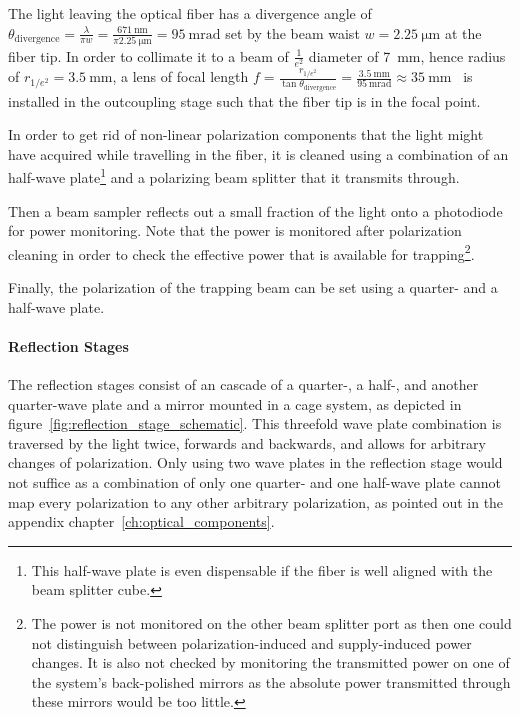The light leaving the optical fiber has a divergence angle of $\theta_\text{divergence} = \frac{\lambda}{\pi w} = \frac{\SI{671}{\nano\meter}}{\pi\SI{2.25}{\micro\meter}} = \SI{95}{\milli\radian}$ set by the beam waist $w = \SI{2.25}{\micro\meter}$ at the fiber tip. In order to collimate it to a beam of $\frac{1}{e^2}$ diameter of \SI{7}{\milli\meter}, hence radius of $r_{1/e^2} = \SI{3.5}{\milli\meter}$, a lens of focal length $f = \frac{r_{1/e^2}}{\tan \theta_\text{divergence}} = \frac{\SI{3.5}{\milli\meter}}{\SI{95}{\milli\radian}} \approx \SI{35}{\milli\meter}$~\cite{noauthor_collimated_2021} is installed in the outcoupling stage such that the fiber tip is in the focal point.

In order to get rid of non-linear polarization components that the light might have acquired while travelling in the fiber, it is cleaned using a combination of an half-wave plate\footnote{This half-wave plate is even dispensable if the fiber is well aligned with the beam splitter cube.} and a polarizing beam splitter that it transmits through.

Then a beam sampler reflects out a small fraction of the light onto a photodiode for power monitoring. Note that the power is monitored after polarization cleaning in order to check the effective power that is available for trapping\footnote{The power is not monitored on the other beam splitter port as then one could not distinguish between polarization-induced and supply-induced power changes. It is also not checked by monitoring the transmitted power on one of the system's back-polished mirrors as the absolute power transmitted through these mirrors would be too little.}.

Finally, the polarization of the trapping beam can be set using a quarter- and a half-wave plate.

\paragraph{Reflection Stages}
The reflection stages consist of an cascade of a quarter-, a half-, and another quarter-wave plate and a mirror mounted in a cage system, as depicted in figure~\ref{fig:reflection_stage_schematic}. This threefold wave plate combination is traversed by the light twice, forwards and backwards, and allows for arbitrary changes of polarization. Only using two wave plates in the reflection stage would not suffice as a combination of only one quarter- and one half-wave plate cannot map every polarization to any other arbitrary polarization, as pointed out in the appendix chapter~\ref{ch:optical_components}.

